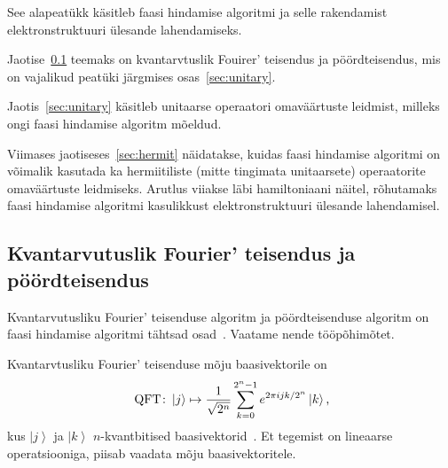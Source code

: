\documentclass[12pt]{report}
\def\ket#1{\left|#1\right>}
\def\QFT{\mathop{\rm QFT}\nolimits}
\begin{document}
See alapeatükk käsitleb faasi hindamise algoritmi ja selle rakendamist elektronstruktuuri ülesande lahendamiseks.

Jaotise~\ref{sec:qft} teemaks on kvantarvtuslik Fouirer' teisendus ja pöördteisendus, mis on vajalikud peatüki järgmises osas~\ref{sec:unitary}.

Jaotis~\ref{sec:unitary} käsitleb unitaarse operaatori omaväärtuste leidmist, milleks ongi faasi hindamise algoritm mõeldud.

Viimases jaotiseses~\ref{sec:hermit} näidatakse, kuidas faasi hindamise algoritmi on võimalik kasutada ka hermiitiliste (mitte tingimata unitaarsete) operaatorite omaväärtuste leidmiseks.
Arutlus viiakse läbi hamiltoniaani näitel, rõhutamaks faasi hindamise algoritmi kasulikkust elektronstruktuuri ülesande lahendamisel.


\subsection{Kvantarvutuslik Fourier' teisendus ja pöördteisendus}\label{sec:qft}

Kvantarvutusliku Fourier' teisenduse algoritm ja pöördteisenduse algoritm on faasi hindamise algoritmi tähtsad osad~\cite{nielsen+chuang, kaye+laflamme+mosca}.
Vaatame nende tööpõhimõtet.

Kvantarvtusliku Fourier' teisenduse mõju baasivektorile on
\begin{align}\label{f:qftdef}
    \QFT\colon
    \ket{j} \mapsto \frac{1}{\sqrt{2^n}} \sum_{k=0}^{2^n-1} e^{2\pi ijk/2^n} \ket{k} \rlap{,}
\end{align}
kus \(\ket{j}\) ja \(\ket{k}\) \(n\)-kvantbitised
baasivektorid~\cite{nielsen+chuang, kaye+laflamme+mosca}. Et tegemist on
lineaarse operatsiooniga, piisab vaadata mõju baasivektoritele.
\end{document}
